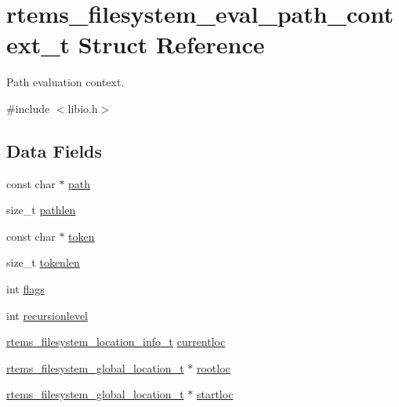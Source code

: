 \hypertarget{structrtems__filesystem__eval__path__context__t}{}\section{rtems\+\_\+filesystem\+\_\+eval\+\_\+path\+\_\+context\+\_\+t Struct Reference}
\label{structrtems__filesystem__eval__path__context__t}


Path evaluation context.  




{\ttfamily \#include $<$libio.\+h$>$}

\subsection*{Data Fields}
\begin{DoxyCompactItemize}
\item 
const char $\ast$ \mbox{\hyperlink{structrtems__filesystem__eval__path__context__t_a19a0670ba9cb99f7a278d94ef5e40976}{path}}
\item 
size\+\_\+t \mbox{\hyperlink{structrtems__filesystem__eval__path__context__t_a662e1489770167e61029944cb8bad463}{pathlen}}
\item 
const char $\ast$ \mbox{\hyperlink{structrtems__filesystem__eval__path__context__t_ad04a4c94c347445b25ecba910af4a7a1}{token}}
\item 
size\+\_\+t \mbox{\hyperlink{structrtems__filesystem__eval__path__context__t_abd2a3eb23c5007e2e9f963ecb036992c}{tokenlen}}
\item 
int \mbox{\hyperlink{structrtems__filesystem__eval__path__context__t_ad21e2cded14e7609d73014c7dd25d058}{flags}}
\item 
int \mbox{\hyperlink{structrtems__filesystem__eval__path__context__t_a067816cfa618d7a0cd718b8bb82a284c}{recursionlevel}}
\item 
\mbox{\hyperlink{group__LibIO_ga3252b3d31ee3c49ffff0b7604a676864}{rtems\+\_\+filesystem\+\_\+location\+\_\+info\+\_\+t}} \mbox{\hyperlink{structrtems__filesystem__eval__path__context__t_a0a2e1116817b8255eadbb2e151e6e19a}{currentloc}}
\item 
\mbox{\hyperlink{structrtems__filesystem__global__location__t}{rtems\+\_\+filesystem\+\_\+global\+\_\+location\+\_\+t}} $\ast$ \mbox{\hyperlink{structrtems__filesystem__eval__path__context__t_abad8ed35464aaa22a2299db3feb1402f}{rootloc}}
\item 
\mbox{\hyperlink{structrtems__filesystem__global__location__t}{rtems\+\_\+filesystem\+\_\+global\+\_\+location\+\_\+t}} $\ast$ \mbox{\hyperlink{structrtems__filesystem__eval__path__context__t_ae50d64ee35aba1ddf2bc70a87b9de99f}{startloc}}
\end{DoxyCompactItemize}


